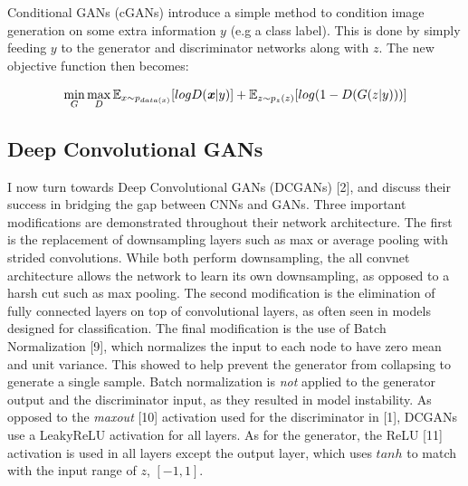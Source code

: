 \documentclass[9pt]{article}
\begin{document}
\noindent Conditional GANs (cGANs) introduce a simple method to condition image generation on some extra information $y$ (e.g a class label). This is done by simply feeding
$y$ to the generator and discriminator networks along with $z$. The new objective function then becomes:

\[\min\limits_{G}\max\limits_{D} \mathbb{E}_{x \sim p_{data(x)}} [logD(\textbf{\textit{x}}|y)] + \mathbb{E}_{z \sim p_z(z)}[log(1 - D(G(z|y)))]\]



\subsection{Deep Convolutional GANs}
I now turn towards Deep Convolutional GANs (DCGANs) [2], and discuss their success in bridging the gap between CNNs and GANs. Three important modifications are demonstrated throughout
their network architecture. The first is the replacement of downsampling layers such as max or average pooling with strided convolutions. While both perform downsampling, the
all convnet architecture allows the network to learn its own downsampling, as opposed to a harsh cut such as max pooling. The second modification is the elimination of fully
connected layers on top of convolutional layers, as often seen in models designed for classification. The final modification is the use of Batch Normalization [9], which normalizes
the input to each node to have zero mean and unit variance. This showed to help prevent the generator from collapsing to generate a single sample. Batch normalization is \textit{not}
applied to the generator output and the discriminator input, as they resulted in model instability. As opposed to the \textit{maxout} [10] activation used for the discriminator in
[1], DCGANs use a LeakyReLU activation for all layers. As for the generator, the ReLU [11] activation is used in all layers except the output layer, which uses $tanh$ to match
with the input range of $z$, $[-1,1]$. \newline
\end{document}
